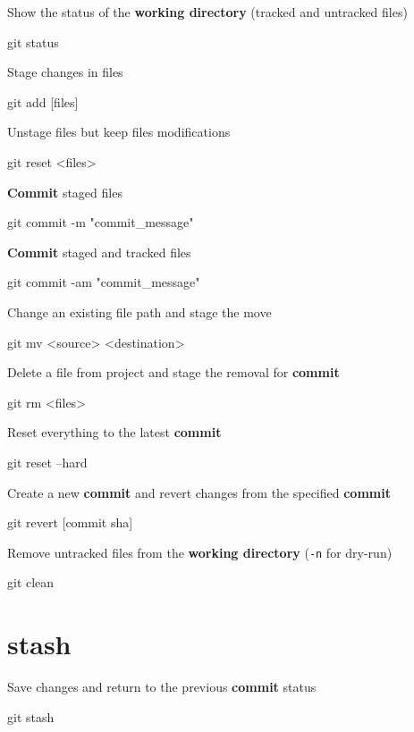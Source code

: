 \documentclass{refcard}
\begin{document}
Show the status of the \textbf{working directory} (tracked and untracked files)
\begin{ttyenv}
git status
\end{ttyenv}

Stage changes in files
\begin{ttyenv}
git add [files]
\end{ttyenv}

Unstage files but keep files modifications
\begin{ttyenv}
git reset <files>
\end{ttyenv}

\textbf{Commit} staged files
\begin{ttyenv}
git commit -m "commit_message"
\end{ttyenv}

\textbf{Commit} staged and tracked files
\begin{ttyenv}
git commit -am "commit_message"
\end{ttyenv}

Change an existing file path and stage the move
\begin{ttyenv}
git mv <source> <destination>
\end{ttyenv}

Delete a file from project and stage the removal for \textbf{commit}
\begin{ttyenv}
git rm <files>
\end{ttyenv}

Reset everything to the latest \textbf{commit}
\begin{ttyenv}
git reset --hard
\end{ttyenv}

Create a new \textbf{commit} and revert changes from the specified \textbf{commit}
\begin{ttyenv}
git revert [commit sha]
\end{ttyenv}

Remove untracked files from the \textbf{working directory} (\verb|-n| for dry-run)
\begin{ttyenv}
git clean
\end{ttyenv}

\section{stash}

Save changes and return to the previous \textbf{commit} status
\begin{ttyenv}
git stash
\end{ttyenv}
\end{document}
